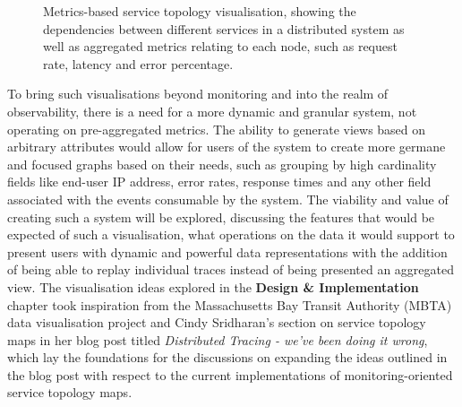\documentclass[12pt,pdftex,titlepage]{report}
\begin{document}
                \medskip
                \begin{figure}[hbt!]
                    \centering
                    \caption{Metrics-based service topology visualisation, showing the dependencies between different services in a distributed system as well as
                    aggregated metrics relating to each node, such as request rate, latency and error percentage.}
                \end{figure}
                
                \newpage
                To bring such visualisations beyond monitoring and into the realm of observability, there is a need for a more dynamic and granular 
                system, not operating on pre-aggregated metrics. The ability to generate views based on arbitrary attributes would allow for users 
                of the system to create more germane and focused graphs based on their needs, such as grouping by high cardinality fields like end-user IP address, 
                error rates, response times and any other field associated with the events consumable by the system\cite{doingitwrongtopo}. The viability and 
                value of creating such a system will be explored, discussing the features that would be expected of such a visualisation, what operations on the
                data it would support to present users with dynamic and powerful data representations with the addition of being able to replay individual traces 
                instead of being presented an aggregated view. The visualisation ideas explored in the \textbf{Design \& Implementation} chapter took inspiration from
                the Massachusetts Bay Transit Authority (MBTA) data visualisation project\cite{mbta} and Cindy Sridharan's section on service topology maps in her blog 
                post titled \textit{Distributed Tracing - we've been doing it wrong}\cite{doingitwrongtopo}, which lay the foundations for the discussions on 
                expanding the ideas outlined in the blog post with respect to the current implementations of monitoring-oriented service topology maps.
    
\end{document}
